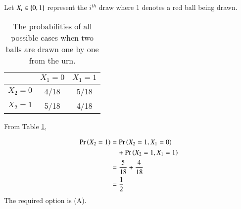 Let $X_i \in \left\{0,1\right\}$ represent the $i^{th}$ draw where 1 denotes a red ball being drawn.

\begin{table}[h]
\centering 
\begin{tabular}{|c|c|c|}
\hline
           & $X_1 = 0$ & $X_1 = 1$\\
\hline
$X_2 = 0$  & 4/18      & 5/18  \\
\hline
$X_2 = 1$  & 5/18      & 4/18  \\
\hline
\end{tabular}
\caption{The probabilities of all possible cases when two balls are drawn one by one from the urn.}
\label{axioms/4/table:}
\end{table}
 
From Table \ref{axioms/4/table:},

\begin{align}
    \Pr\left(X_2 = 1\right) &= \Pr\left(X_2 = 1,X_1 = 0\right) \nonumber \\
    & \quad +\Pr\left(X_2 = 1,X_1 = 1\right) \\
                 &=\frac{5}{18}+\frac{4}{18} \\
                 &= \frac{1}{2}
\end{align}
The required option is (A).
